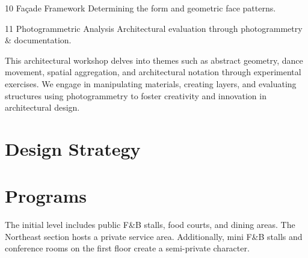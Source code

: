 \begin{minipage}[t][\textheight][t]{\linewidth}
\begin{center}
\begin{minipage}[t]{0.8125\linewidth}
\begin{minipage}[t]{\MinipageBWidth}
			\end{minipage}%
			\vfill
			\begin{minipage}[t]{\MinipageAWidth}%
				\Figure{%
					
				}%
				{10}%
				{Façade Framework}%
				{Determining the form and geometric face patterns.}%
			\end{minipage}%
			\hspace{\MinipageGap}%
			\begin{minipage}[t]{\MinipageBWidth}%
				\Figure{%
					
				}%
				{11}%
				{Photogrammetric Analysis}%
				{Architectural evaluation through photogrammetry \& documentation.}%
			\end{minipage}%
		\end{minipage}
	\end{center}
	\vfill
	This architectural workshop delves into themes such as abstract geometry, dance movement, spatial aggregation, and architectural notation through experimental exercises. We engage in manipulating materials, creating layers, and evaluating structures using photogrammetry to foster creativity and innovation in architectural design.
\end{minipage}
\newpage
\section*{
  Design Strategy
 }
\begin{center}
	\vspace{-\baselineskip}%
	\begin{minipage}[t]{0.8\linewidth}
		
	\end{minipage}
\end{center}
\vspace{-\baselineskip}%
\vfill
\section*{
  Programs
 }

\vfill
The initial level includes public F\&B stalls, food courts, and dining areas. The Northeast section hosts a private service area. Additionally, mini F\&B stalls and conference rooms on the first floor create a semi-private character.
\vfill

\columnbreak%
